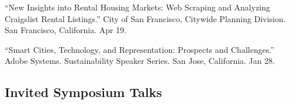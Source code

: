 \documentclass[11pt,a4paper]{report} %
\begin{document}
\begin{tablist}
\item[2016] \tab{}\enquote{New Insights into Rental Housing Markets: Web Scraping and Analyzing Craigslist Rental Listings.} City of San Francisco, Citywide Planning Division. San Francisco, California. Apr 19.

\item[2016] \tab{}\enquote{Smart Cities, Technology, and Representation: Prospects and Challenges.} Adobe Systems. Sustainability Speaker Series. San Jose, California. Jan 28.

\end{tablist}

\subsection*{Invited Symposium Talks}
\end{document}
